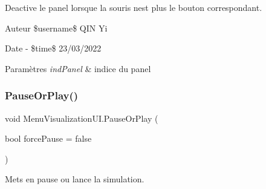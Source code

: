 Deactive le panel lorsque la souris n\textquotesingle{}est plus le bouton correspondant. 

\begin{DoxyAuthor}{Auteur}
\$username\$ Q\+IN Yi 
\end{DoxyAuthor}
\begin{DoxyDate}{Date}
-\/ \$time\$ 23/03/2022 
\begin{DoxyParams}{Paramètres}
{\em ind\+Panel} & indice du panel\\
\hline
\end{DoxyParams}

\end{DoxyDate}
\mbox{\label{class_menu_visualization_u_i_a9affc75173b7b9e70340b2b934398464}} 
\subsubsection{\texorpdfstring{Pause\+Or\+Play()}{PauseOrPlay()}}
{\footnotesize\ttfamily void Menu\+Visualization\+U\+I.\+Pause\+Or\+Play (\begin{DoxyParamCaption}\item[{bool}]{force\+Pause = {\ttfamily false} }\end{DoxyParamCaption})\hspace{0.3cm}{\ttfamily [inline]}}



Mets en pause ou lance la simulation. 

